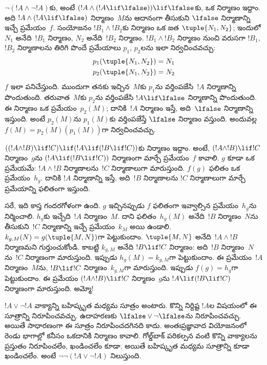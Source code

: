 \documentclass[../../../include/open-logic-section]{subfiles}
\begin{document}
\begin{ex}
$\lnot(!A \land \lnot !A)$కు, అంటే $(!A
\land (!A \lif \lfalse)) \lif \lfalse$కు,
ఒక నిర్మాణం ఇద్దాం. అది $!A \land (!A \lif
\lfalse)$ నిర్మాణం~$M$ను ఆదానంగా తీసుకుని
$\lfalse$ నిర్మాణాన్ని ఇచ్చే ప్రమేయం~$f$.
సంయోజనం $!B_1 \land !B_2$కు నిర్మాణం ఒక జత
$\tuple{N_1, N_2}$; ఇందులో $N_1$ అనేది~$!B_1$
నిర్మాణం, $N_2$ అనేది~$!B_2$ నిర్మాణం. $!B_1
\land !B_2$ నిర్మాణం నుంచి వరుసగా $!B_1$,
$!B_2$ నిర్మాణాలను తిరిగి పొందే ప్రమేయాలు
$p_1$, $p_2$లను ఇలా నిర్వచించవచ్చు:
\begin{align*}
  p_1(\tuple{N_1, N_2}) &= N_1\\
  p_2(\tuple{N_1, N_2}) &= N_2
\end{align*}
$f$ ఇలా పనిచేస్తుంది. ముందుగా తనకు ఇచ్చిన~$M$కు
$p_1$ను వర్తింపజేసి~$!A$ నిర్మాణాన్ని పొందుతుంది.
తరువాత~$M$కు $p_2$ను వర్తింపజేసి $!A \lif
\lfalse$ నిర్మాణాన్ని పొందుతుంది. ఈ నిర్మాణం
ఒక ప్రమేయం~$p_2(M)$; దానికి~$!A$ నిర్మాణం
ఇస్తే, అది~$\lfalse$ నిర్మాణాన్ని ఇస్తుంది.
అంటే $p_2(M)$ను $p_1(M)$కు వర్తింపజేస్తే
$\lfalse$ నిర్మాణం వస్తుంది. అందువల్ల
$f(M) = p_2(M)(p_1(M))$గా నిర్వచించవచ్చు.
\end{ex}

\begin{ex}
$((!A \land !B) \lif !C) \lif (!A \lif
(!B \lif !C))$కు నిర్మాణం ఇద్దాం. అంటే,
$(!A \land !B) \lif !C$ నిర్మాణం~$g$ను
$(!A \lif (!B \lif
!C))$ నిర్మాణంగా మార్చే ప్రమేయం~$f$ కావాలి.
$g$ కూడా ఒక ప్రమేయమే: $!A \land !B$
నిర్మాణాలను~$!C$ నిర్మాణాలుగా మారుస్తుంది.
$f(g)$ ఫలితం ఒక ప్రమేయం~$h_g$. దానికి $!A$ నిర్మాణాన్ని
ఇస్తే, అది~$!B$ నిర్మాణాలను $!C$ నిర్మాణాలుగా మార్చే
ప్రమేయాన్ని ఫలితంగా ఇస్తుంది.

సరే, ఇది కాస్త గందరగోళంగా ఉంది. $g$ ఇచ్చినప్పుడు
$f$ ఫలితంగా ఇవ్వాల్సిన ప్రమేయం~$h_g$ను నిర్మించాలి.
$h_g$కు ఇచ్చేది~$!A$ నిర్మాణం~$M$. దాని ఫలితం~$h_g(M)$
అనేది~$!B$ నిర్మాణం~$N$ను తీసుకుని~$!C$ నిర్మాణాన్ని ఇచ్చే
ప్రమేయం~$k_M$ అయి ఉండాలి. $k_{g,M}(N) =
g(\tuple{M, N})$గా పెట్టుకుందాం. $\tuple{M,
  N}$ అనేది~$!A \land !B$ నిర్మాణమని గుర్తుంచుకోండి.
కాబట్టి $k_{g,M}$ అనేది $!B \lif !C$ నిర్మాణం:
అది~$!B$ నిర్మాణం~$N$ను~$!C$ నిర్మాణంగా
మారుస్తుంది. ఇప్పుడు $h_g(M) = k_{g,M}$గా
పెట్టుకుందాం. ఈ ప్రమేయం~$!A$ నిర్మాణం~$M$ను,
$!B \lif !C$ నిర్మాణం~$k_{g,M}$గా మారుస్తుంది.
ఇప్పుడు $f(g) = h_g$గా పెట్టుకుందాం. ఈ ప్రమేయం
$(!A \land !B) \lif !C$ నిర్మాణం~$g$ను
$!A \lif (!B \lif !C)$ నిర్మాణంగా మారుస్తుంది.
అమ్మో!{}
\end{ex}

$!A \lor \lnot !A$ వాక్యాన్ని బహిష్కృత మధ్యమ
సూత్రం అంటారు. కొన్ని నిర్దిష్ట $!A$ల విషయంలో ఈ
సూత్రాన్ని నిరూపించవచ్చు. ఉదాహరణకు $\lfalse \lor
\lnot \lfalse$ను నిరూపించవచ్చు. అయితే సాధారణంగా
ఈ సూత్రం నిరూపించదగినది కాదు. అంతఃప్రజ్ఞావాద
వియోజనంలో రెండు భాగాల్లో కనీసం ఒకదానికి నిర్మాణం
కావాలి. గోల్డ్‌బాక్ పరికల్పన వంటి కొన్ని వాక్యాలను
ప్రస్తుతం నిరూపించలేం, ఖండించలేం కూడా. అయితే
బహిష్కృత మధ్యమ సూత్రాన్ని కూడా ఖండించలేం. అంటే
$\lnot \lnot (!A
\lor \lnot !A)$ నిలుస్తుంది.
\end{document}
